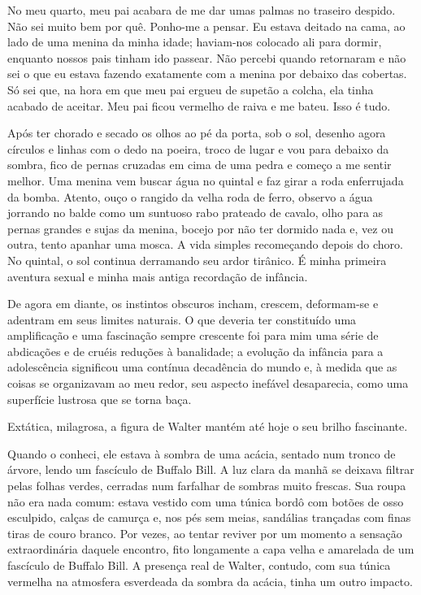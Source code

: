 No meu quarto, meu pai acabara de me dar umas palmas no traseiro despido. Não sei muito bem por quê. Ponho-me a pensar. Eu estava deitado na cama, ao lado de uma menina da minha idade; haviam-nos colocado ali para dormir, enquanto nossos pais tinham ido passear. Não percebi quando retornaram e não sei o que eu estava fazendo exatamente com a menina por debaixo das cobertas. Só sei que, na hora em que meu pai ergueu de supetão a colcha, ela tinha acabado de aceitar. Meu pai ficou vermelho de raiva e me bateu. Isso é tudo.

Após ter chorado e secado os olhos ao pé da porta, sob o sol, desenho agora círculos e linhas com o dedo na poeira, troco de lugar e vou para debaixo da sombra, fico de pernas cruzadas em cima de uma pedra e começo a me sentir melhor. Uma menina vem buscar água no quintal e faz girar a roda enferrujada da bomba. Atento, ouço o rangido da velha roda de ferro, observo a água jorrando no balde como um suntuoso rabo prateado de cavalo, olho para as pernas grandes e sujas da menina, bocejo por não ter dormido nada e, vez ou outra, tento apanhar uma mosca. A vida simples recomeçando depois do choro. No quintal, o sol continua derramando seu ardor tirânico. É minha primeira aventura sexual e minha mais antiga recordação de infância.

De agora em diante, os instintos obscuros incham, crescem, deformam-se e adentram em seus limites naturais. O que deveria ter constituído uma amplificação e uma fascinação sempre crescente foi para mim uma série de abdicações e de cruéis reduções à banalidade; a evolução da infância para a adolescência significou uma contínua decadência do mundo e, à medida que as coisas se organizavam ao meu redor, seu aspecto inefável desaparecia, como uma superfície lustrosa que se torna baça.

Extática, milagrosa, a figura de Walter mantém até hoje o seu brilho fascinante.

Quando o conheci, ele estava à sombra de uma acácia, sentado num tronco de árvore, lendo um fascículo de Buffalo Bill.  A luz clara da manhã se deixava filtrar pelas folhas verdes, cerradas num farfalhar de sombras muito frescas. Sua roupa não era nada comum: estava vestido com uma túnica bordô com botões de osso esculpido, calças de camurça e, nos pés sem meias, sandálias trançadas com finas tiras de couro branco. Por vezes, ao tentar reviver por um momento a sensação extraordinária daquele encontro, fito longamente a capa velha e amarelada de um fascículo de Buffalo Bill. A presença real de Walter, contudo, com sua túnica vermelha na atmosfera esverdeada da sombra da acácia, tinha um outro impacto.


